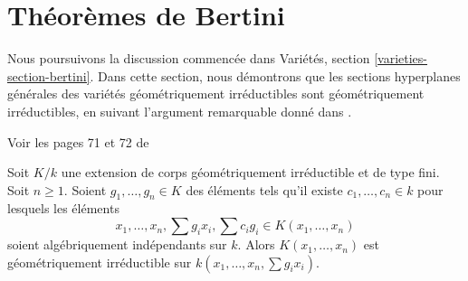 \section{Théorèmes de Bertini}
\label{section-bertini}

\noindent
Nous poursuivons la discussion commencée dans
Variétés, section \ref{varieties-section-bertini}.
Dans cette section, nous démontrons que les sections hyperplanes générales
des variétés géométriquement irréductibles sont géométriquement irréductibles,
en suivant l'argument remarquable donné dans \cite{Jou}.

\begin{lemma}
\label{lemma-amazing-bertini-lemma}
\begin{reference}
Voir les pages 71 et 72 de \cite{Jou}
\end{reference}
Soit $K/k$ une extension de corps géométriquement irréductible et de type fini.
Soit $n \geq 1$.
Soient $g_1, \ldots, g_n \in K$ des éléments tels qu'il
existe $c_1, \ldots, c_n \in k$ pour lesquels les éléments
$$
x_1, \ldots, x_n, \sum g_ix_i, \sum c_ig_i \in K(x_1, \ldots, x_n)
$$
soient algébriquement indépendants sur $k$. Alors
$K(x_1, \ldots, x_n)$ est géométriquement irréductible sur
$k(x_1, \ldots, x_n, \sum g_ix_i)$.
\end{lemma}

